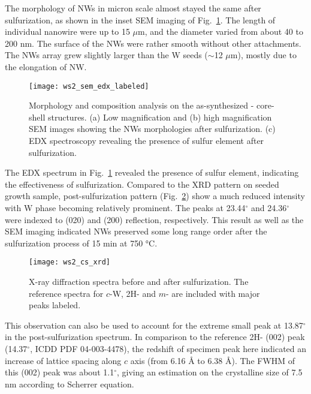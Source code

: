 The morphology of  NWs in micron scale almost stayed the same after sulfurization, as shown in the inset SEM imaging of Fig.~\ref{fig:ch5ws2sem}. The length of individual nanowire were up to 15 $\mu$m, and the diameter varied from about 40 to 200 nm. The surface of the NWs were rather smooth without other attachments. The NWs array grew slightly larger than the W seeds ($\sim$12 $\mu$m), mostly due to the elongation of NW.
\begin{figure}[htb]
\centering
\texttt{[image: ws2\_sem\_edx\_labeled]}
\caption[Morphology and composition analysis on the core-shell structures]{Morphology and composition analysis on the as-synthesized - core-shell structures. (a) Low magnification and (b) high magnification SEM images showing the NWs morphologies after sulfurization. (c) EDX spectroscopy revealing the presence of sulfur element after sulfurization.}
\label{fig:ch5ws2sem}
\end{figure}
The EDX spectrum in Fig.~\ref{fig:ch5ws2sem} revealed the presence of sulfur element, indicating the effectiveness of sulfurization. Compared to the XRD pattern on seeded growth  sample, post-sulfurization pattern (Fig.~\ref{fig:ch5ws2xrd}) show a much reduced  intensity with W phase becoming relatively prominent. The peaks at 23.44$^{\circ}$ and 24.36$^{\circ}$ were indexed to  (020) and (200) reflection, respectively. This result as well as the SEM imaging indicated  NWs preserved some long range order after the sulfurization process of 15 min at 750 \si{\degreeCelsius}. 
\begin{figure}[htb]
\centering
\texttt{[image: ws2\_cs\_xrd]}
\caption[X-ray diffraction spectra before and after sulfurization]{X-ray diffraction spectra before and after sulfurization. The reference spectra for $c$-W, 2H- and $m$- are included with major peaks labeled.}
\label{fig:ch5ws2xrd}
\end{figure}
This observation can also be used to account for the extreme small peak at 13.87$^{\circ}$ in the post-sulfurization spectrum. In comparison to the reference 2H- (002) peak (14.37$^{\circ}$, ICDD PDF 04-003-4478), the redshift of specimen peak here indicated an increase of lattice spacing along $c$ axis (from 6.16 \si{\angstrom} to 6.38 \si{\angstrom}). The FWHM of this (002) peak was about 1.1$^{\circ}$, giving an estimation on the crystalline size of 7.5 nm according to Scherrer equation. 


